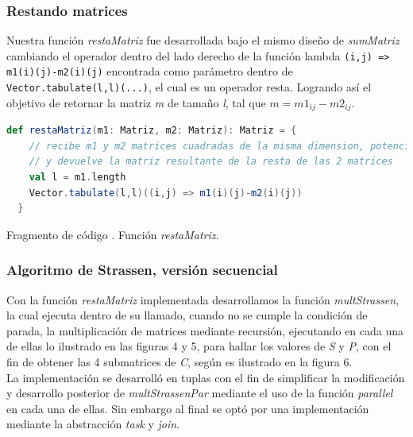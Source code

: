 \documentclass{article}
\newcounter{codesnippet}
\newcommand{\newcodesnippet}{%
  \stepcounter{codesnippet}%
}
\begin{document}
\subsubsection{Restando matrices}

Nuestra función \textit{restaMatriz} fue desarrollada bajo el mismo diseño de \textit{sumMatriz} cambiando el operador dentro del lado derecho de la función lambda \verb|(i,j) => m1(i)(j)-m2(i)(j)| encontrada como parámetro dentro de \verb|Vector.tabulate(l,l)(...)|, el cual es un operador resta. Logrando así el objetivo de retornar la matriz \textit{m} de tamaño \textit{l}, tal que \(m = m1_{ij} - m2_{ij}\).

\newcodesnippet
\begin{lstlisting}[language=Scala]
  def restaMatriz(m1: Matriz, m2: Matriz): Matriz = {
    // recibe m1 y m2 matrices cuadradas de la misma dimension, potencia de 2
    // y devuelve la matriz resultante de la resta de las 2 matrices
    val l = m1.length
    Vector.tabulate(l,l)((i,j) => m1(i)(j)-m2(i)(j))
  }
\end{lstlisting}
\begin{center}
    \small{Fragmento de código \thecodesnippet. Función \textit{restaMatriz}.}
\end{center}
\subsubsection{Algoritmo de Strassen, versión secuencial}

Con la función \textit{restaMatriz} implementada desarrollamos la función \textit{multStrassen}, la cual ejecuta dentro de su llamado, cuando no se cumple la condición de parada, la multiplicación de matrices mediante recursión, ejecutando en cada una de ellas lo ilustrado en las figuras 4 y 5, para hallar los valores de \textit{S} y \textit{P}, con el fin de obtener las 4 submatrices de \textit{C}, según es ilustrado en la figura 6. \\

La implementación se desarrolló en tuplas con el fin de simplificar la modificación y desarrollo posterior de \textit{multStrassenPar} mediante el uso de la función \textit{parallel} en cada una de ellas. Sin embargo al final se optó por una implementación mediante la abstracción \textit{task} y \textit{join}.
\end{document}
